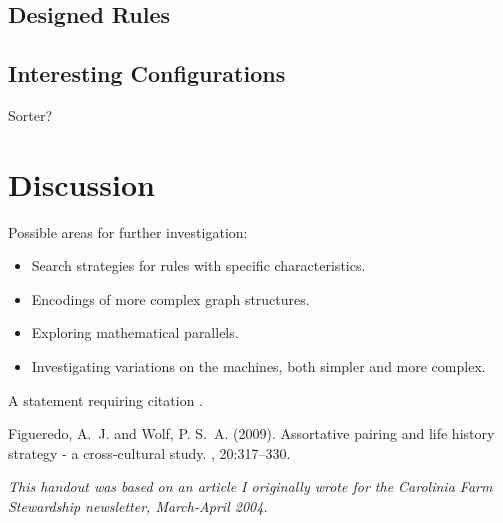 \documentclass{tufte-handout}
\begin{document}
\subsection{Designed Rules}

\subsection{Interesting Configurations}
Sorter?


\section{Discussion}

Possible areas for further investigation:

\begin{itemize}
    \item Search strategies for rules with specific characteristics.
    \item Encodings of more complex graph structures.
    \item Exploring mathematical parallels.
    \item Investigating variations on the machines, both simpler and more complex.
\end{itemize}

A statement requiring citation \cite{Figueredo:2009dg}.


\begin{thebibliography}{99} %

Figueredo, A.~J. and Wolf, P. S.~A. (2009).
\newblock Assortative pairing and life history strategy - a cross-cultural
  study.
, 20:317--330.
 
\end{thebibliography}

\vspace{1cm}

\emph{This handout was based on an article I originally wrote for the Carolinia Farm Stewardship newsletter, March-April 2004.}
\end{document}
